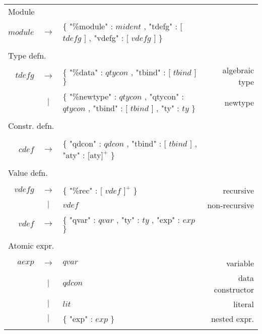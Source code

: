 \begin{footnotesize}
\begin{longtable}{ r c l r }

\\[0.01in]
\multicolumn{4}{l}{Module}		\\
$module$	& $ \rightarrow $ 	& $\{$ "\%module" : $mident$ , "tdefg" : $[$ $tdefg$ $]$ , "vdefg" : $[$ $vdefg$ $]$ $\}$			&			\\
\\[0.01in]

\multicolumn{4}{l}{Type defn.}		\\
$tdefg$ 	& $ \rightarrow $	& $\{$ "\%data" : $qtycon$ , "tbind" : $[$ $tbind$ $]$ $\}$							& algebraic type	\\
		& $ | $			& $\{$ "\%newtype" : $qtycon$ , "qtycon" : $qtycon$ , "tbind" : $[$ $tbind$ $]$ , "ty" : $ty$ $\}$ 		& newtype		\\
\\[0.01in]

\multicolumn{4}{l}{Constr. defn.}	\\
\\[0.01in]
$cdef$		& $ \rightarrow $	& $\{$ "qdcon" : $qdcon$ , "tbind" : $[$ $tbind$ $ ]$ , "aty" : $[$aty$]^{+}$ $\}$ 				& 			\\
\\[0.01in]

\multicolumn{4}{l}{Value defn.}		\\
\\[0.01in]
$vdefg$		& $ \rightarrow $	& $\{$ "\%rec" : $[$ $vdef$ $]^{+}$ $\}$    									& recursive		\\
		& $ | $			& $vdef$													& non-recursive		\\
$vdef$ 		& $ \rightarrow $	& $\{$ "qvar" : $qvar$ , "ty" : $ty$ , "exp" : $exp$ $\}$ 							& 			\\
\\[0.01in]

\multicolumn{4}{l}{Atomic expr.}	\\
\\[0.01in]
$aexp$		& $ \rightarrow $	& $qvar$													& variable		\\
		& $ | $			& $qdcon$													& data constructor	\\
		& $ | $			& $lit$														& literal		\\
		& $ | $			& $\{$ "exp" : $exp$ $\}$ 											& nested expr.		\\
\\[0.01in]


\end{longtable}
\end{footnotesize}
